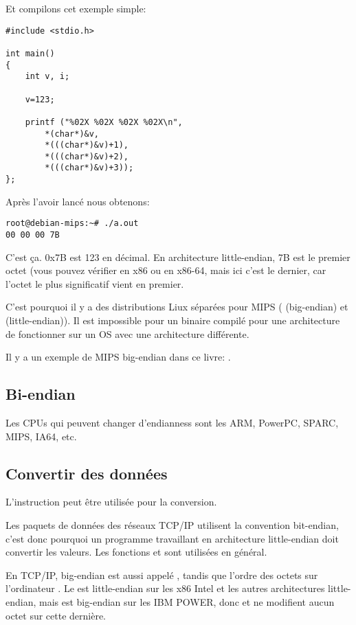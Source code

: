 Et compilons cet exemple simple:

\begin{lstlisting}[style=customc]
#include <stdio.h>

int main()
{
	int v, i;

	v=123;

	printf ("%02X %02X %02X %02X\n", 
		*(char*)&v,
		*(((char*)&v)+1),
		*(((char*)&v)+2),
		*(((char*)&v)+3));
};
\end{lstlisting}

Après l'avoir lancé nous obtenons:

\begin{lstlisting}
root@debian-mips:~# ./a.out 
00 00 00 7B
\end{lstlisting}

C'est ça.
0x7B est 123 en décimal.
En architecture little-endian, 7B est le premier octet (vous pouvez vérifier en x86
ou en x86-64, mais ici c'est le dernier, car l'octet le plus significatif vient en
premier.

C'est pourquoi il y a des distributions Liux séparées pour MIPS ( (big-endian)
et  (little-endian)).
Il est impossible pour un binaire compilé pour une architecture de fonctionner sur
un \ac{OS} avec une architecture différente.

Il y a un exemple de MIPS big-endian dans ce livre: .

\subsection{Bi-endian}

Les CPUs qui peuvent changer d'endianness sont les ARM, PowerPC, SPARC, MIPS, \ac{IA64}, etc.

\subsection{Convertir des données}

L'instruction  peut être utilisée pour la conversion.

Les paquets de données des réseaux TCP/IP utilisent la convention bit-endian, c'est
donc pourquoi un programme travaillant en architecture little-endian doit convertir
les valeurs.
Les fonctions  et  sont utilisées en général.

En TCP/IP, big-endian est aussi appelé , tandis que l'ordre
des octets sur l'ordinateur .
Le  est little-endian sur les x86 Intel et les autres architectures
little-endian, mais est big-endian sur les IBM POWER, donc  et 
ne modifient aucun octet sur cette dernière.

